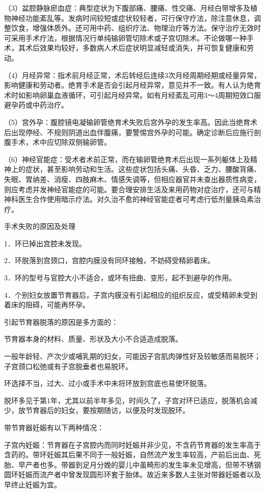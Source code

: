 \documentclass[12pt,UTF8,openany]{ctexbook}
\begin{document}
（3）盆腔静脉瘀血症：典型症状为下腹部痛、腰痛、性交痛、月经白带增多及植物神经功能紊乱等。发病时间较短或症状较轻者，可行保守疗法，除注意休息，调整饮食，增强体质外。还可用中药、组织疗法、物理治疗等方法。保守治疗无效时可采用手术疗法，根据情况行单纯输卵管切除术或子宫切除术。不论做哪一种手术，其术后效果均较好，多数病人术后症状明显减轻或消失，并可恢复健康和劳动。

（4）月经异常：指术前月经正常，术后转经后连续3次月经周期经期或经量异常，影响健康和劳动者。绝育手术是否会引起月经异常，意见并不一致。有人认为绝育术时如影响卵巢血液循环，可引起月经异常。如有月经紊乱可用3～4周期短效口服避孕药或中药治疗。

（5）宫外孕：腹腔镜电凝输卵管绝育术失败后宫外孕的发生率高。因此当绝育术后出现停经、不规则阴道出血伴腹痛，要警惕宫外孕的可能。确定诊断后应施行剖腹手术，术中应切除双侧输卵管。

（6）神经官能症：受术者术前正常，而在输卵管绝育术后出现一系列躯体上及精神上的症状，甚至影响劳动和生活。这些症状包括头痛、头昏、乏力、腰酸背痛、失眠、胃纳差、消瘦、四肢麻木、情感失调等，但相应器官并未查出器质性病变，则应考虑并发神经官能症的可能。要合理安排生活及来用药物对症治疗，还可与精神科医生合作使用暗示疗法。对久治不愈的神经官能症者可考虑行低剂量胰岛素治疗。





手术失败的原因及处理


1．环已掉出宫腔未发现。

2．环脱落到宫颈口，宫腔内膜没有同环接触，不妨碍受精卵着床。

3．环的型号与官腔大小不适合，或环有扭曲、变形，起不到避孕的作用。

4．个别妇女放置节育器后，子宫内膜没有引起相应的组织反应，或受精卵未受到着床的阻碍，可能再怀孕。

引起节育器脱落的原因是多方面的：

节育器本身的材料、质量、形状及大小不合适造成脱落。

一般年龄轻、产次少或哺乳期的妇女，可能因子宫肌肉弹性好及较敏感而易脱环；子宫颈口松弛或有子宫脱垂者也易脱环。

环选择不当，过大、过小或手术中未将环放到宫底也易使环脱落。

脱环多见于第1年，尤其以前半年多见，时间久了，子宫对环已适应，脱落机会减少，放节育器后的妇女，要按期随访，以便及时发现脱环。

带节育器妊娠有以下两种情况：

子宫内妊娠：节育器在子宫腔内而同时妊娠并非少见，不含药节育器的发生率高于含药的。带环妊娠其后果不同于一般妊娠，自然流产发生率较高，产前后出血、死胎、早产者也多。带器到足月分娩的婴儿中虽畸形的发生率未见增高，但带不锈钢圆环妊娠而流产者中曾发现圆形环套于胎体。故近来多数人主张对带器妊娠者以及早终止妊娠为宜。
\end{document}
